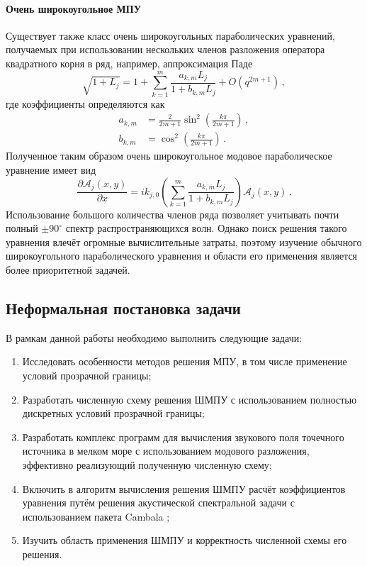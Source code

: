 \documentclass{fefu}
\newcommand{\pa}[1]{\left(#1\right)}
\begin{document}
                \paragraph{Очень широкоугольное МПУ}
                    \par Существует также класс очень широкоугольных параболических уравнений, получаемых при использовании нескольких членов разложения оператора квадратного корня в ряд, например, аппроксимация Паде \cite{jensen}
                    \begin{equation}
                        \sqrt{1+L_j}=1+\sum\limits_{k=1}^m\frac{a_{k,m}L_j}{1+b_{k,m}L_j}+O\pa{q^{2m+1}}\,,
                    \end{equation}
                    где коэффициенты определяются как
                    \begin{align*}
                        a_{k,m}&=\frac{2}{2m+1}\sin^2\pa{\frac{k\pi}{2m+1}}\,,\\
                        b_{k,m}&=\cos^2\pa{\frac{k\pi}{2m+1}}\,.
                    \end{align*}
                    Полученное таким образом очень широкоугольное модовое параболическое уравнение имеет вид
                    \begin{equation}
                        \frac{\partial\mathcal{A}_j\pa{x,y}}{\partial x}=ik_{j,0}\pa{\sum\limits_{k=1}^m\frac{a_{k,m}L_j}{1+b_{k,m}L_j}}\mathcal{A}_j\pa{x,y}\,.
                    \end{equation}
                    Использование большого количества членов ряда позволяет учитывать почти полный $\pm90^{\circ}$ спектр распространяющихся волн. Однако поиск решения такого уравнения влечёт огромные вычислительные затраты, поэтому изучение обычного широкоугольного параболического уравнения и области его применения является более приоритетной задачей.
        \subsection{Неформальная постановка задачи}
            \par В рамкам данной работы необходимо выполнить следующие задачи:
            \begin{enumerate}
                \item Исследовать особенности методов решения МПУ, в том числе применение условий прозрачной границы;
                \item Разработать численную схему решения ШМПУ с использованием полностью дискретных условий прозрачной границы;
                \item Разработать комплекс программ для вычисления звукового поля точечного источника в мелком море с использованием модового разложения, эффективно реализующий полученную численную схему;
                \item Включить в алгоритм вычисления решения ШМПУ расчёт коэффициентов уравнения путём решения акустической спектральной задачи с использованием пакета Cambala \cite{cambala};
                \item Изучить область применения ШМПУ и корректность численной схемы его решения.
            \end{enumerate}
\end{document}
